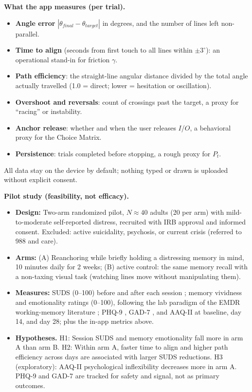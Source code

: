 \documentclass[11pt]{article}
\begin{document}
\textbf{What the app measures (per trial).}
\begin{itemize}[leftmargin=1.2em]
\item \textbf{Angle error} $|\theta_{final}-\theta_{target}|$ in degrees, and the number of lines left non-parallel.
\item \textbf{Time to align} (seconds from first touch to all lines within $\pm 3^\circ$): an operational stand-in for friction $\gamma$.
\item \textbf{Path efficiency}: the straight-line angular distance divided by the total angle actually travelled (1.0 = direct; lower = hesitation or oscillation).
\item \textbf{Overshoot and reversals}: count of crossings past the target, a proxy for ``racing'' or instability.
\item \textbf{Anchor release}: whether and when the user releases $I$/$O$, a behavioral proxy for the Choice Matrix.
\item \textbf{Persistence}: trials completed before stopping, a rough proxy for $P_t$.
\end{itemize}
All data stay on the device by default; nothing typed or drawn is uploaded without explicit consent.

\textbf{Pilot study (feasibility, not efficacy).}
\begin{itemize}[leftmargin=1.2em]
\item \textbf{Design:} Two-arm randomized pilot, $N\approx 40$ adults (20 per arm) with mild-to-moderate self-reported distress, recruited with IRB approval and informed consent. Excluded: active suicidality, psychosis, or current crisis (referred to 988 and care).
\item \textbf{Arms:} (A) Reanchoring while briefly holding a distressing memory in mind, 10 minutes daily for 2 weeks; (B) active control: the same memory recall with a non-taxing visual task (watching lines move without manipulating them).
\item \textbf{Measures:} SUDS (0--100) before and after each session \cite{wolpe}; memory vividness and emotionality ratings (0--100), following the lab paradigm of the EMDR working-memory literature \cite{vdh,lee}; PHQ-9 \cite{phq}, GAD-7 \cite{gad}, and AAQ-II \cite{aaq} at baseline, day 14, and day 28; plus the in-app metrics above.
\item \textbf{Hypotheses.} H1: Session SUDS and memory emotionality fall more in arm A than arm B. H2: Within arm A, faster time to align and higher path efficiency across days are associated with larger SUDS reductions. H3 (exploratory): AAQ-II psychological inflexibility decreases more in arm A. PHQ-9 and GAD-7 are tracked for safety and signal, not as primary outcomes.
\end{itemize}
\end{document}
